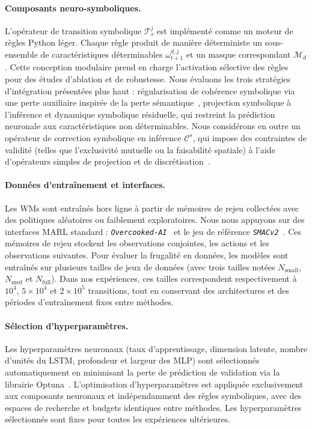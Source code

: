 \documentclass[final]{jfsma}
\theoremstyle{plain}
\theoremstyle{definition}
\theoremstyle{remark}
\begin{document}
\paragraph{Composants neuro-symboliques.}
L'opérateur de transition symbolique $\mathcal{T}^j_s$ est implémenté comme un moteur de règles Python léger.
Chaque règle produit de manière déterministe un sous-ensemble de caractéristiques déterminables $\omega^{d,j}_{t+1}$
et un masque correspondant $\mathcal{M}_d$.
Cette conception modulaire prend en charge l'activation sélective des règles pour des études d'ablation et de robustesse.
Nous évaluons les trois stratégies d'intégration présentées plus haut : régularisation de cohérence symbolique via une perte auxiliaire inspirée de la perte sémantique~\cite{Xu2018semanticloss,Fan2017differentiablelearninglogicalrules}, projection symbolique à l'inférence et dynamique symbolique résiduelle, qui restreint la prédiction neuronale aux caractéristiques non déterminables.
Nous considérons en outre un opérateur de correction symbolique en inférence $\mathcal{C}^s$,
qui impose des contraintes de validité (telles que l'exclusivité mutuelle ou la faisabilité spatiale)
à l'aide d'opérateurs simples de projection et de discrétisation~\cite{garcez2023neurosymbolic}.

\paragraph{Données d'entraînement et interfaces.}
Les WMs sont entraînés hors ligne à partir de mémoires de rejeu collectées avec des politiques aléatoires ou faiblement exploratoires.
Nous nous appuyons sur des interfaces MARL standard :
\emph{\texttt{Overcooked-AI}}~\cite{Micah2020overcooked}
et le jeu de référence \emph{\texttt{SMACv2}}~\cite{Ellis2023smacv2}.
Ces mémoires de rejeu stockent les observations conjointes, les actions et les observations suivantes.
Pour évaluer la frugalité en données, les modèles sont entraînés sur plusieurs tailles de jeux de données
(avec trois tailles notées $N_{\text{small}}$, $N_{\text{med}}$ et $N_{\text{full}}$).
Dans nos expériences, ces tailles correspondent respectivement à $10^4$, $5\times 10^4$ et $2\times 10^5$ transitions, tout en conservant des architectures et des périodes d'entraînement fixes entre méthodes.

\paragraph{Sélection d'hyperparamètres.}
Les hyperparamètres neuronaux (taux d'apprentissage, dimension latente, nombre d'unités du LSTM, profondeur et largeur des MLP)
sont sélectionnés automatiquement
en minimisant la perte de prédiction de validation via la librairie Optuna~\cite{akiba2019optuna}.
L'optimisation d'hyperparamètres est appliquée exclusivement aux composants neuronaux
et indépendamment des règles symboliques, avec des espaces de recherche et budgets identiques entre méthodes.
Les hyperparamètres sélectionnés sont fixes pour toutes les expériences ultérieures.
\end{document}
